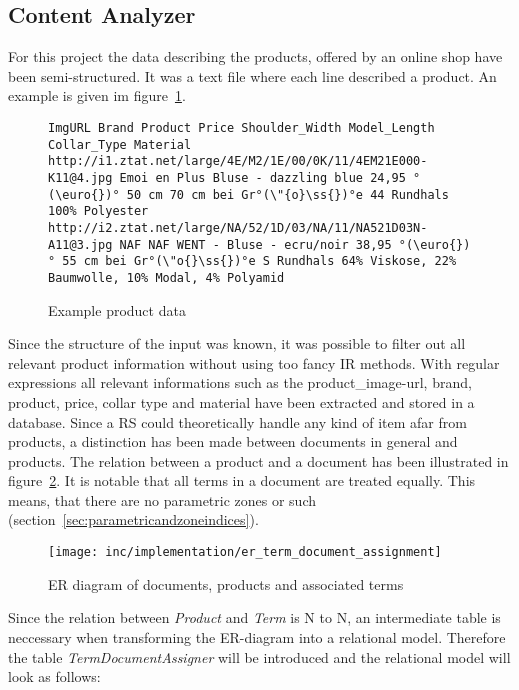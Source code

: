 
\subsection{Content Analyzer}
For this project the data describing the products, offered by an online shop have been semi-structured.
It was a text file where each line described a product.
An example is given im figure~\ref{fig:productdata}.
\begin{figure}[h]
\begin{lstlisting}
ImgURL Brand Product Price Shoulder_Width Model_Length Collar_Type Material
http://i1.ztat.net/large/4E/M2/1E/00/0K/11/4EM21E000-K11@4.jpg Emoi en Plus Bluse - dazzling blue 24,95 °(\euro{})° 50 cm 70 cm bei Gr°(\"{o}\ss{})°e 44 Rundhals 100% Polyester
http://i2.ztat.net/large/NA/52/1D/03/NA/11/NA521D03N-A11@3.jpg NAF NAF WENT - Bluse - ecru/noir 38,95 °(\euro{})° 55 cm bei Gr°(\"o{}\ss{})°e S Rundhals 64% Viskose, 22% Baumwolle, 10% Modal, 4% Polyamid
\end{lstlisting}
    \caption{Example product data}
    \label{fig:productdata}
\end{figure}
Since the structure of the input was known, it was possible to filter out all relevant product information without using too fancy IR methods.
With regular expressions all relevant informations such as the product\_image-url, brand, product, price, collar type and material have been extracted and stored in a database.
Since a RS could theoretically handle any kind of item afar from products, a distinction has been made between documents in general and products.
The relation between a product and a document has been illustrated in figure~\ref{fig:ertermdocumentassignment}.
It is notable that all terms in a document are treated equally.
This means, that there are no parametric zones or such (section~\ref{sec:parametricandzoneindices}).
\begin{figure}[h]
    \center
    \texttt{[image: inc/implementation/er\_term\_document\_assignment]}
    \caption{ER diagram of documents, products and associated terms}
    \label{fig:ertermdocumentassignment}
\end{figure}
Since the relation between \textit{Product} and \textit{Term} is N to N, an intermediate table is neccessary when transforming the ER-diagram into a relational model.
Therefore the table \textit{TermDocumentAssigner} will be introduced and the relational model will look as follows:

